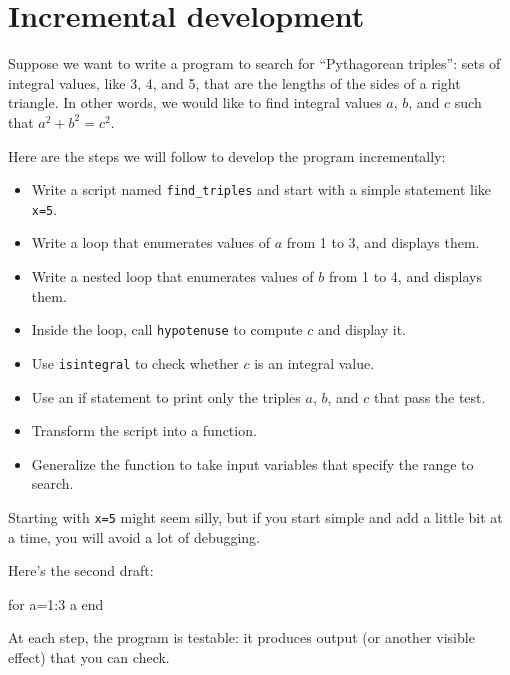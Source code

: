 \documentclass[
]{book}
\numberwithin{Answer}{chapter}
\numberwithin{Exercise}{chapter}
\begin{document}
\section{Incremental development}
\label{sect:increxample}

Suppose we want to write a program to search for ``Pythagorean
triples'': sets of integral values, like 3, 4, and 5,
that are the lengths of the sides of a right triangle.  In other
words, we would like to find integral values $a$, $b$, and $c$ such
that $a^2 + b^2 = c^2$.

Here are the steps we will follow to develop the program incrementally:

\begin{itemize}

\item Write a script named {\tt find\_triples} and start with a simple
statement like {\tt x=5}.

\item Write a loop that enumerates values of $a$ from 1 to 3, and
displays them.

\item Write a nested loop that enumerates values of $b$ from 1 to 4,
and displays them.

\item Inside the loop, call {\tt hypotenuse} to compute $c$ and
display it.

\item Use {\tt isintegral} to check whether $c$ is an integral
value.

\item Use an if statement to print only the triples $a$, $b$, and $c$
that pass the test.

\item Transform the script into a function.

\item Generalize the function to take input variables that
specify the range to search.

\end{itemize}

Starting with {\tt x=5} might seem
silly, but if you start simple and add a little bit at a time, you
will avoid a lot of debugging.

Here's the second draft:

\begin{code}
for a=1:3
    a
end
\end{code}

At each step, the program is testable: it produces output (or another
visible effect) that you can check.
\end{document}
